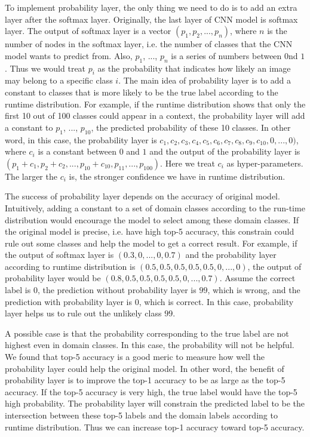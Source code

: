\documentclass[conference]{IEEEtran}
\begin{document}
\begin{spacing}{0.9}
To implement probability layer, the only thing we need to do is to add an extra layer after the softmax layer. Originally, the last layer of CNN model is softmax layer. The output of softmax layer is a vector $(p_1, p_2, ..., p_n)$, where $n$ is the number of nodes in the softmax layer, i.e. the number of classes that the CNN model wants to predict from. Also, $p_1$, ..., $p_n$ is a series of numbers between $0$nd $1$. Thus we would treat $p_i$ as the probability that indicates how likely an image may belong to a specific class $i$. The main idea of probability layer is to add a constant to classes that is more likely to be the true label according to the runtime distribution. For example, if the runtime distribution shows that only the first 10 out of 100 classes could appear in a context, the probability layer will add a constant to $p_1$, ..., $p_{10}$, the predicted probability of these 10 classes. In other word, in this case, the probability layer is $ c_1, c_2, c_3, c_4, c_5, c_6, c_7, c_8, c_9, c_{10}, 0, ...,0 )$, where $c_i$ is a constant between $0$ and $1$ and the output of the probability layer is $(p_1 + c_1, p_2 + c_2, ..., p_{10}+c_{10}, p_{11}, ..., p_{100})$. Here we treat $c_i$ as hyper-parameters. The larger the $c_i$ is, the stronger confidence we have in runtime distribution.

The success of probability layer depends on the accuracy of original model. Intuitively, adding a constant to a set of domain classes according to the run-time distribution would encourage the model to select among these domain classes. If the original model is precise, i.e. have high top-5 accuracy, this constrain could rule out some classes and help the model to get a correct result. For example, if the output of softmax layer is $(0.3, 0, ..., 0, 0.7)$ and the probability layer according to runtime distribution is $(0.5, 0.5, 0.5, 0.5, 0.5, 0, ..., 0)$, the output of probability layer would be $(0.8, 0.5, 0.5, 0.5, 0.5, 0, ..., 0.7)$. Assume the correct label is $0$,  the prediction without probability layer is $99$, which is wrong, and the prediction with probability layer is $0$, which is correct. In this case, probability layer helps us to rule out the unlikely class $99$.

A possible case is that the probability corresponding to the true label are not highest even in domain classes. In this case, the probability will not be helpful. We found that top-5 accuracy is a good meric to measure how well the probability layer could help the original model. In other word, the benefit of probability layer is to improve the top-1 accuracy to be as large as the top-5 accuracy. If the top-5 accuracy is very high, the true label would have the top-5 high probability. The probability layer will constrain the predicted label to be the intersection between these top-5 labels and the domain labels according to runtime distribution. Thus we can increase top-1 accuracy toward top-5 accuracy. 


\end{spacing}
\end{document}
